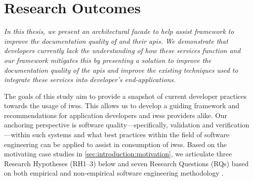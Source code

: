 \section{Research Outcomes}
\label{sec:introduction:hypohtesis}

\begin{framed}
\itshape
\noindent
In this thesis, we present an architectural facade to help assist  framework to improve the documentation quality of  and their \glspl{api}. We demonstrate that developers currently lack the understanding of how these services function and our framework mitigates this by presenting a solution to improve the documentation quality of the \glspl{api} and improve the existing techniques used to integrate these services into developer's end-applications.
\end{framed}

\upshape
\bigskip

The goals of this study aim to provide a snapshot of current developer practices towards the usage of \glspl{iws}. This allows us to develop a guiding framework and recommendations for application developers and \glspl{iws} providers alike. Our anchoring perspective is software quality---specifically, validation and verification---within such systems and what best practices within the field of software engineering can be applied to assist in consumption of \glspl{iws}.
 Based on the motivating case studies in \cref{sec:introduction:motivation}, we articulate three Research Hypotheses (RH1--3) below and seven Research Questions (RQs) based on  both empirical and non-empirical software engineering methodology \citep{Shull:2007vh,Simon:1996uw}.

\newcommand{\rh}[1]{\hyperref[rh#1]{RH#1}}

